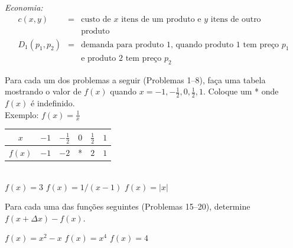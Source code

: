 \emph{Economia:}
\begin{eqnarray*}
 c(x, y) & = & \text{custo de $x$ itens de um produto e $y$ itens de outro} \\
         &   & \text{produto} \\
 D_1(p_1, p_2) & = & \text{demanda para produto 1, quando produto 1 tem preço $p_1$}\\
              &   & \text{e produto 2 tem preço $p_2$}
\end{eqnarray*}

\begin{sectionproblems}

Para cada um dos problemas a seguir (Problemas 1--8), faça uma tabela
mostrando o valor de $f(x)$ quando $x = -1, -\frac{1}{2}, 0, \frac{1}{2}, 1$.
Coloque um * onde $f(x)$ é indefinido.\\

Exemplo:
$\displaystyle f(x) = \frac{1}{x}$%
\SPC\SPC\SPC%
\begin{tabular}{c @{\SPC} | @{\SPC} c @{\SPC} c @{\SPC} c @{\SPC} c @{\SPC} c}
   $x$ & $-1$ & $-\frac{1}{2}$ & $0$ & $\frac{1}{2}$ & $1$ \\
\hline
$f(x)$ & $-1$ &     $-2$       &  *  &      $2$      & $1$
\end{tabular}\\

%
        {$f(x) = 3$}
%
        {$f(x) = 1/(x-1)$}
%
        {$f(x) = |x|$}

Para cada uma das funções seguintes (Problemas 15--20), determine
$f(x + \Delta x) - f(x)$.

%
        {$f(x) = x^2 - x$}
%
        {$f(x) = x^4$}
%
        {$f(x) = 4$}


\end{sectionproblems}
